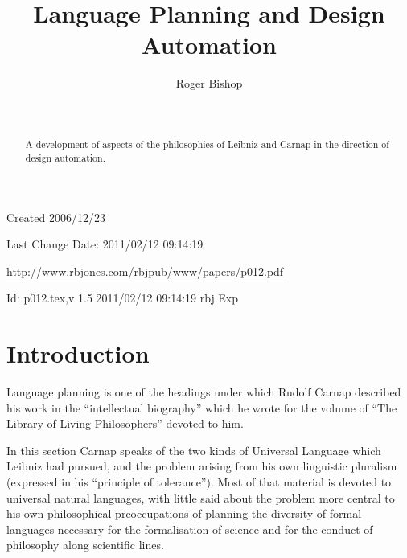 \documentclass[numreferences]{rbjk}
\begin{document}
                                                                                   
\begin{article}
\begin{opening}  
\title{Language Planning and Design Automation}
\author{Roger Bishop }
\date{$ $\ $ $}

\begin{abstract}
A development of aspects of the philosophies of Leibniz and Carnap in the direction of design automation.
\end{abstract}

\end{opening}

\vfill

\begin{centering}
\footnotesize{
Created 2006/12/23

Last Change $ $Date: 2011/02/12 09:14:19 $ $

\href{http://www.rbjones.com/rbjpub/www/papers/p012.pdf}{http://www.rbjones.com/rbjpub/www/papers/p012.pdf}

$ $Id: p012.tex,v 1.5 2011/02/12 09:14:19 rbj Exp $ $\\

}%
\end{centering}

\newpage
\setcounter{tocdepth}{4}
{\parskip-0pt\tableofcontents}

\section{Introduction}

Language planning is one of the headings under which Rudolf Carnap described his work in the ``intellectual biography''\cite{carnap63} which he wrote for the volume of ``The Library of Living Philosophers'' devoted to him\cite{carnap63a}.

In this section Carnap speaks of the two kinds of Universal Language which Leibniz had pursued, and the problem arising from his own linguistic pluralism (expressed in his ``principle of tolerance'').
Most of that material is devoted to universal natural languages, with little said about the problem more central to his own philosophical preoccupations of planning the diversity of formal languages necessary for the formalisation of science and for the conduct of philosophy along scientific lines.


\end{article}
\end{document}
